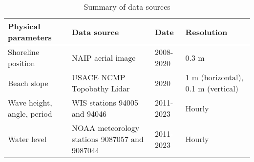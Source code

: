 \begin{table}[htbp]
\centering
\caption{Summary of data sources}
\label{Summary of data sources}
\begin{tabular}{|p{3cm}|p{4cm}|p{4cm}|p{4cm}|}
\hline
\textbf{Physical parameters} & \textbf{Data source} & \textbf{Date} & \textbf{Resolution} \\ \hline
Shoreline position & NAIP aerial image & 2008-2020 & 0.3 m \\ \hline
Beach slope & USACE NCMP Topobathy Lidar & 2020 & 1 m (horizontal), 0.1 m (vertical) \\ \hline
Wave height, angle, period & WIS stations 94005 and 94046 & 2011-2023 & Hourly \\ \hline
Water level & NOAA meteorology stations 9087057 and 9087044 & 2011-2023 & Hourly \\ \hline
\end{tabular}
\end{table}
